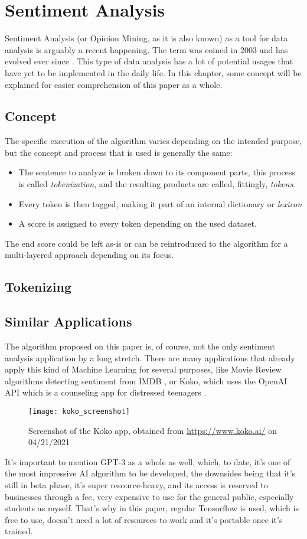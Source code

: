 \chapter{Sentiment Analysis}
Sentiment Analysis (or Opinion Mining, as it is also known) as a tool for data analysis is arguably a recent happening. The term was coined in 2003 and has evolved ever since \citep{rf3}.
This type of data analysis has a lot of potential usages that have yet to be implemented in the daily life.
In this chapter, some concept will be explained for easier comprehension of this paper as a whole.

\section{Concept}
The specific execution of the algorithm varies depending on the intended purpose, but the concept and process that is used is generally the same:
\begin{itemize}
	\item The sentence to analyze is broken down to its component parts, this process is called \textit{tokenization}, and the resulting products are called, fittingly, \textit{tokens}.
	\item Every token is then tagged, making it part of an internal dictionary or \textit{lexicon}
	\item A score is assigned to every token depending on the used dataset.
\end{itemize}
The end score could be left as-is or can be reintroduced to the algorithm for a multi-layered approach depending on its focus. \citep{rf4}

\section{Tokenizing}

\section{Similar Applications}
The algorithm proposed on this paper is, of course, not the only sentiment analysis application by a long stretch. There are many applications that already apply this kind of Machine Learning for several purposes, like Movie Review algorithms detecting sentiment from IMDB \citep{rf5}, or Koko, which uses the OpenAI API which is a counseling app for distressed teenagers \citep{rf6}.
\begin{figure}[h]
	\centering
	\texttt{[image: koko\_screenshot]}
	\caption{Screenshot of the Koko app, obtained from \url{https://www.koko.ai/} on 04/21/2021}
	\label{fig:koko}
\end{figure}
It's important to mention GPT-3 as a whole as well, which, to date, it's one of the most impressive AI algorithm to be developed, the downsides being that it's still in beta phase, it's super resource-heavy, and its access is reserved to businesses through a fee, very expensive to use for the general public, especially students as myself. That's why in this paper, regular Tensorflow is used, which is free to use, doesn't need a lot of resources to work and it's portable once it's trained.

\clearpage